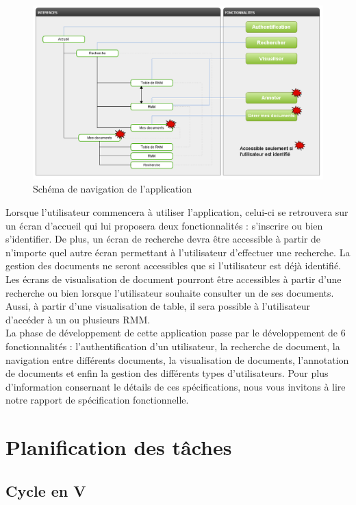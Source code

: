 \documentclass[a4paper]{article}
\begin{document}
\begin{figure}[H]
\centering
\includegraphics[width=\textwidth]{navigation.png}
\caption{Schéma de navigation de l'application}
\label{fig:navigation}
\end{figure}

	Lorsque l’utilisateur commencera à utiliser l’application, celui-ci se retrouvera sur un écran d’accueil qui lui proposera deux fonctionnalités : s'inscrire ou bien s’identifier. De plus, un écran de recherche devra être accessible à partir de n’importe quel autre écran permettant à l'utilisateur d'effectuer une recherche. La gestion des documents ne seront accessibles que si l’utilisateur est déjà identifié. Les écrans de visualisation de document pourront être accessibles à partir d’une recherche ou bien lorsque l’utilisateur souhaite consulter un de ses documents. Aussi, à partir d’une visualisation de table, il sera possible à l’utilisateur d’accéder à un ou plusieurs RMM.\\
	
	La phase de développement de cette application passe par le développement de 6 fonctionnalités : l'authentification d'un utilisateur, la recherche de document, la navigation entre différents documents, la visualisation de documents, l'annotation de documents et enfin la gestion des différents types d'utilisateurs. Pour plus d'information consernant le détails de ces spécifications, nous vous invitons à lire notre rapport de spécification fonctionnelle.\\
	
\section{Planification des tâches}
	
	\subsection{Cycle en V}
	
\end{document}
